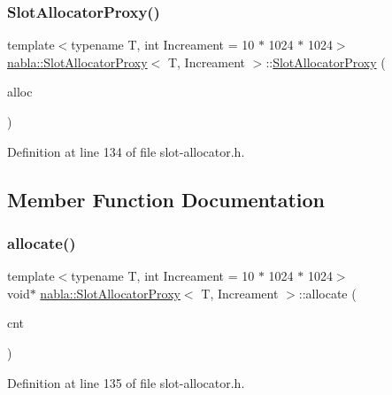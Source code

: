 \subsubsection{\texorpdfstring{SlotAllocatorProxy()}{SlotAllocatorProxy()}}
{\footnotesize\ttfamily template$<$typename T, int Increament = 10 $\ast$ 1024 $\ast$ 1024$>$ \\
\mbox{\hyperlink{classnabla_1_1_slot_allocator_proxy}{nabla\+::\+Slot\+Allocator\+Proxy}}$<$ T, Increament $>$\+::\mbox{\hyperlink{classnabla_1_1_slot_allocator_proxy}{Slot\+Allocator\+Proxy}} (\begin{DoxyParamCaption}\item[{\mbox{\hyperlink{classnabla_1_1_slot_allocator}{Slot\+Allocator}}$<$ Increament $>$ \&}]{alloc }\end{DoxyParamCaption})\hspace{0.3cm}{\ttfamily [inline]}}



Definition at line 134 of file slot-\/allocator.\+h.



\subsection{Member Function Documentation}
\mbox{\label{classnabla_1_1_slot_allocator_proxy_a05daafc13137ba556aa706cda7b06547}} 
\subsubsection{\texorpdfstring{allocate()}{allocate()}}
{\footnotesize\ttfamily template$<$typename T, int Increament = 10 $\ast$ 1024 $\ast$ 1024$>$ \\
void$\ast$ \mbox{\hyperlink{classnabla_1_1_slot_allocator_proxy}{nabla\+::\+Slot\+Allocator\+Proxy}}$<$ T, Increament $>$\+::allocate (\begin{DoxyParamCaption}\item[{size\+\_\+t}]{cnt }\end{DoxyParamCaption})\hspace{0.3cm}{\ttfamily [inline]}}



Definition at line 135 of file slot-\/allocator.\+h.

